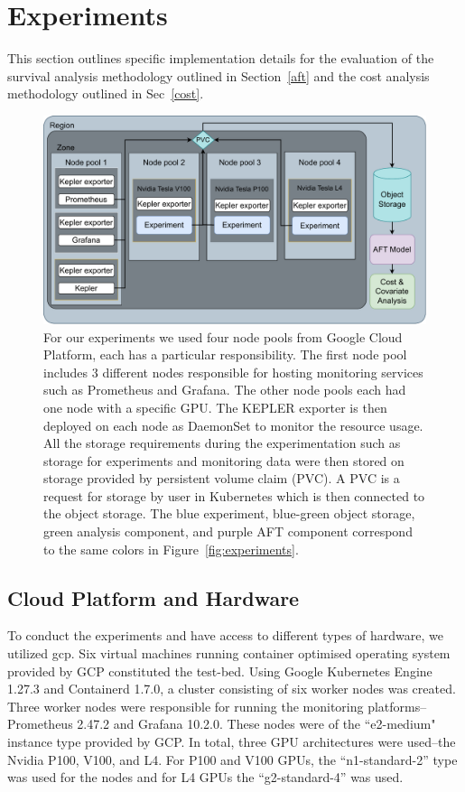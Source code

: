 \documentclass[sn-mathphys-num]{sn-jnl}%
\begin{document}
\section{Experiments}
\label{experiments}

This section outlines specific implementation details for the evaluation of the survival analysis methodology outlined in Section~\ref{aft} and the cost analysis methodology outlined in Sec~\ref{cost}.


\begin{figure}
    \centering
    \includegraphics[width=.9\textwidth]{plots/architecture.pdf}
    \caption{
    For our experiments we used four node pools from Google Cloud Platform, each has a particular responsibility. 
    The first node pool includes 3 different nodes responsible for hosting monitoring services such as Prometheus and Grafana. 
    The other node pools each had one node with a specific GPU.  The KEPLER exporter is then deployed on each node as DaemonSet to monitor the resource usage. 
    All the storage requirements during the experimentation such as storage for experiments and monitoring data were then stored on storage provided by persistent volume claim (PVC). 
    A PVC is a request for storage by user in Kubernetes which is then connected to the object storage. 
    The blue experiment, blue-green object storage, green analysis component, and purple AFT component correspond to the same colors in Figure~\ref{fig:experiments}.}
    \label{fig:architecture}
\end{figure}



\subsection{Cloud Platform and Hardware}
To conduct the experiments and have access to different types of hardware, we utilized \acrshort{gcp}. Six virtual machines running container optimised operating system provided by GCP constituted the test-bed. Using Google Kubernetes Engine 1.27.3 and Containerd 1.7.0, a cluster consisting of six worker nodes was created. Three worker nodes were responsible for running the monitoring platforms-- Prometheus 2.47.2 and Grafana 10.2.0. These nodes were of the ``e2-medium" instance type provided by GCP. In total, three GPU architectures were used--the Nvidia P100, V100, and L4. For P100 and V100 GPUs, the ``n1-standard-2'' type was used for the nodes and for L4 GPUs the ``g2-standard-4'' was used.
\end{document}

